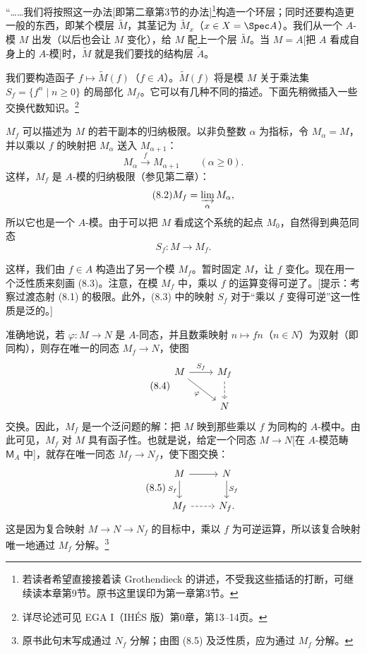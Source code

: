 “……我们将按照这一办法[即第二章第3节的办法]\footnote{若读者希望直接接着读 Grothendieck 的讲述，不受我这些插话的打断，可继续读本章第9节。原书这里误印为第一章第3节。}构造一个环层；同时还要构造更一般的东西，即某个模层 $\widetilde M$，其茎记为 $\widetilde M_x$（$x\in X=\Spec A$）。我们从一个 $A$-模 $M$ 出发（以后也会让 $M$ 变化），给 $M$ 配上一个层 $\widetilde M$。当 $M=A$[把 $A$ 看成自身上的 $A$-模]时，$\widetilde M$ 就是我们要找的结构层 $\widetilde A$。

我们要构造函子 $f\mapsto\widetilde M(f)$（$f\in A$）。$\widetilde M(f)$ 将是模 $M$ 关于乘法集 $S_f=\{f^n\mid n\ge0\}$ 的局部化 $M_f$。它可以有几种不同的描述。下面先稍微插入一些交换代数知识。\footnote{详尽论述可见 EGA I（IHÉS 版）第0章，第13--14页。}

$M_f$ 可以描述为 $M$ 的若干副本的归纳极限。以非负整数 $\alpha$ 为指标，令 $M_\alpha=M$，并以乘以 $f$ 的映射把 $M_\alpha$ 送入 $M_{\alpha+1}$：
\begin{equation}\tag{8.1}
M_\alpha\xrightarrow{\ f\ }M_{\alpha+1}\qquad(\alpha\ge0).
\end{equation}
这样，$M_f$ 是 $A$-模的归纳极限（参见第二章）：
\begin{equation}\tag{8.2}
M_f=\varinjlim_\alpha M_\alpha,
\end{equation}
所以它也是一个 $A$-模。由于可以把 $M$ 看成这个系统的起点 $M_0$，自然得到典范同态
\begin{equation}\tag{8.3}
S_f:M\longrightarrow M_f.
\end{equation}

这样，我们由 $f\in A$ 构造出了另一个模 $M_f$。暂时固定 $M$，让 $f$ 变化。现在用一个泛性质来刻画 (8.3)。注意，在模 $M_f$ 中，乘以 $f$ 的运算变得可逆了。[提示：考察过渡态射 (8.1) 的极限。此外，(8.3) 中的映射 $S_f$ 对于“乘以 $f$ 变得可逆”这一性质是泛的。]

准确地说，若 $\varphi:M\to N$ 是 $A$-同态，并且数乘映射 $n\mapsto fn$（$n\in N$）为双射（即同构），则存在唯一的同态 $M_f\to N$，使图
\begin{equation}\tag{8.4}
\begin{tikzcd}[ampersand replacement=\&]
M\arrow[r,"S_f"]\arrow[dr,"\varphi"']\&M_f\arrow[d,dashed]\\
\&N
\end{tikzcd}
\end{equation}
交换。因此，$M_f$ 是一个泛问题的解：把 $M$ 映到那些乘以 $f$ 为同构的 $A$-模中。由此可见，$M_f$ 对 $M$ 具有函子性。也就是说，给定一个同态 $M\to N$[在 $A$-模范畴 $\mathsf M_A$ 中]，就存在唯一同态 $M_f\to N_f$，使下图交换：
\begin{equation}\tag{8.5}
\begin{tikzcd}[ampersand replacement=\&]
M\arrow[r]\arrow[d,"S_f"']\&N\arrow[d,"S_f"]\\
M_f\arrow[r,dashed]\&N_f.
\end{tikzcd}
\end{equation}
这是因为复合映射 $M\to N\to N_f$ 的目标中，乘以 $f$ 为可逆运算，所以该复合映射唯一地通过 $M_f$ 分解。\footnote{原书此句末写成通过 $N_f$ 分解；由图 (8.5) 及泛性质，应为通过 $M_f$ 分解。}

